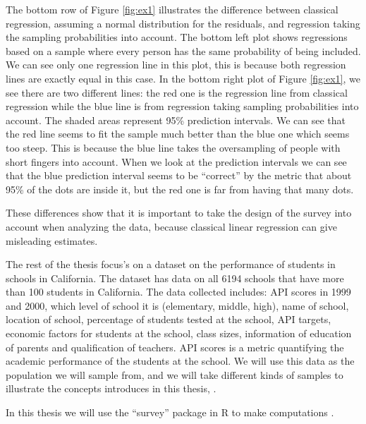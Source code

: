 \documentclass{article}
\begin{document}
\begin{example}
The bottom row of Figure \ref{fig:ex1} illustrates the difference between
classical regression, assuming a normal distribution for the residuals,
and regression taking the sampling probabilities into account. The bottom left plot shows regressions based on a
sample where every person has the same probability of being included. We can see
only one regression line in this plot, this is because both regression lines are
exactly equal in this case. In the bottom right plot of Figure \ref{fig:ex1}, we
see there are two different lines: the red one is the regression line from
classical regression while the blue line is from regression taking sampling
probabilities into account. The shaded areas represent 95\%
prediction intervals. We can see that the red line seems to fit the sample much
better than the blue one which seems too steep. This is because the
blue line takes the oversampling of people with short fingers into account. When we look at the prediction
intervals we can see that the blue prediction interval seems to be ``correct''
by the metric that about 95\% of the dots are inside it, but the red one is far
from having that many dots.

These differences show that it is important to take the design of the survey
into account when analyzing the data, because classical linear regression can
give misleading estimates.
\end{example}

The rest of the thesis focus's on a dataset on the performance of students in schools in
California. The dataset has data on all 6194 schools that have more than 100
students in California. The data collected
includes: API scores in 1999 and 2000, which level of school it is
(elementary, middle, high), name of school, location of school, percentage of
students tested at the school, API targets, economic factors for students at the
school, class sizes, information of education of parents and qualification of teachers.
API scores is a metric quantifying the academic performance of the students at the school.
We will use this data as the population we will sample from, and we will take
different kinds of samples to illustrate the concepts introduces in this thesis,
\cite[Section 1.2]{complexR}.

In this thesis we will use the ``survey'' package in R to make computations \cite{surveyR}.
\end{document}
